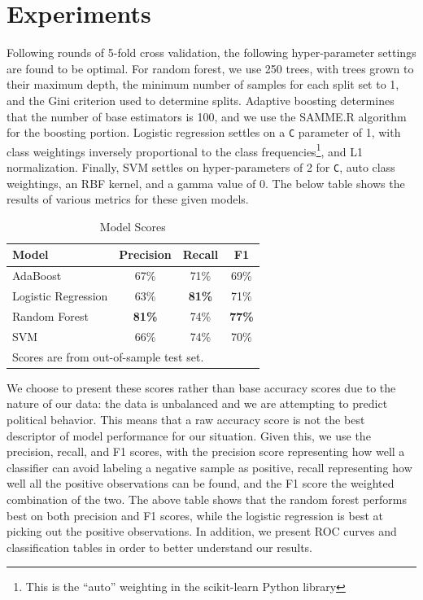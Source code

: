 \documentclass[12pt, letterpaper]{article}
\begin{document}
\section*{Experiments}

Following rounds of 5-fold cross validation, the following hyper-parameter settings are found to be optimal. For random 
forest, we use 250 trees, with trees grown to their maximum depth, the minimum number of samples for each split set to 1, 
and the Gini criterion used to determine splits. Adaptive boosting determines that the number of base estimators is 100, 
and we use the SAMME.R algorithm for the boosting portion. Logistic regression settles on a \texttt{C} parameter of 1, with 
class weightings inversely proportional to the class frequencies\footnote{This is the ``auto'' weighting in the scikit-learn Python library}, and L1 normalization. Finally, SVM settles on hyper-parameters of 2 for \texttt{C}, 
auto class weightings, an RBF kernel, and a gamma value of 0. The below table shows the results of various
metrics for these given models. \\

\begin{center} 
\begin{table}[H]
\caption{Model Scores}
\label{tab:results}
\centering
\begin{tabular}{l c c c} 
\hline\hline           
 Model              & Precision & Recall & F1  \\
\hline
AdaBoost            &  67\%           &  71\%           &  69\% \\
Logistic Regression &  63\%           &  \textbf{81\%}  &  71\% \\
Random Forest       &  \textbf{81\%}  &  74\%           &  \textbf{77\%} \\
SVM                 &  66\%           &  74\%           &  70\% \\
\hline
\multicolumn{3}{l}{Scores are from out-of-sample test set.} \\
\hline\hline
\end{tabular} 
\end{table}
\end{center}

We choose to present these scores rather than base accuracy scores due to the nature of our data: the data is unbalanced and we are attempting
to predict political behavior. This means that a raw accuracy score is not the best descriptor of model performance for our situation. 
Given this, we use the precision, recall, and F1 scores, with the precision score representing how well a classifier 
can avoid labeling a negative sample as positive, recall representing how well all the positive observations can be found, and the F1 score the 
weighted combination of the two. The above table shows that the random forest performs best on both precision and F1 scores, while the logistic
regression is best at picking out the positive observations. In addition, we present ROC curves and classification tables in order to better
understand our results.\\
\end{document}
